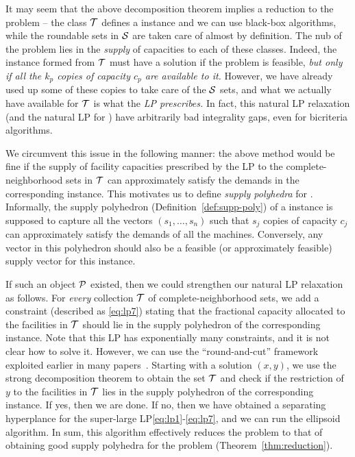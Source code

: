 \medskip {}
It may seem that the above decomposition theorem implies a reduction to the \cckp problem -- the class ${\cal T}$ defines a \cckp instance and we can use black-box algorithms, while the roundable sets in ${\cal S}$ are taken care of almost by definition. The nub of the problem lies in the {\em supply} of capacities to each of these classes.  Indeed, the \cckp instance formed from ${\cal T}$ must have a solution if the \mckc problem is feasible, {\em but only if all the $k_p$ copies of capacity $c_p$ are available to it.} However, we have already used up some of these copies to take care of the ${\cal S}$ sets, and what we actually have available for ${\cal T}$ is what the {\em LP prescribes.} In fact, this natural LP relaxation (and the natural LP for \cckp) have arbitrarily bad integrality gaps, even for bicriteria algorithms.%

\medskip {} We circumvent this issue in the following manner: the above method would be fine if the supply of facility capacities prescribed by the LP to the complete-neighborhood sets in ${\cal T}$ can approximately satisfy the demands in the corresponding \cckp instance. This motivates us to define {\em supply polyhedra} for \cckp. Informally, the supply polyhedron (Definition~\ref{def:supp-poly}) of a \cckp instance is supposed to capture all the vectors $(s_1,\ldots,s_n)$ such that $s_j$ copies of capacity $c_j$ can approximately satisfy the demands of all the machines. Conversely, any vector in this polyhedron should also be a feasible (or approximately feasible) supply vector for this instance.

 If such an object ${\cal P}$ existed, then we could strengthen our natural LP relaxation as follows. For {\em every} collection ${\cal T}$ of complete-neighborhood sets, we add a constraint (described as \eqref{eq:lp7}) stating that the fractional capacity allocated to the facilities in ${\cal T}$ should
 lie in the supply polyhedron of the corresponding \cckp instance. Note that this LP has exponentially many constraints, and it is not clear how to solve it. However, we can use the ``round-and-cut'' framework exploited earlier in many papers~\cite{CarrFLP00,ChakrabartyCKK11,AnSS14,DemirciL16,Li15,Li16}. Starting with a solution $(x,y)$, we use the strong decomposition theorem to obtain the set ${\cal T}$ and check if the restriction of $y$ to the facilities in ${\cal T}$ lies in the supply polyhedron of the corresponding \cckp instance. If yes, then we are done.
 If no, then we have obtained a separating hyperplance for the super-large LP\eqref{eq:lp1}-\eqref{eq:lp7}, and we can run the ellipsoid algorithm. In sum, this algorithm effectively reduces the \mckc problem to that of obtaining good supply polyhedra for the \cckp problem (Theorem~\ref{thm:reduction}).

